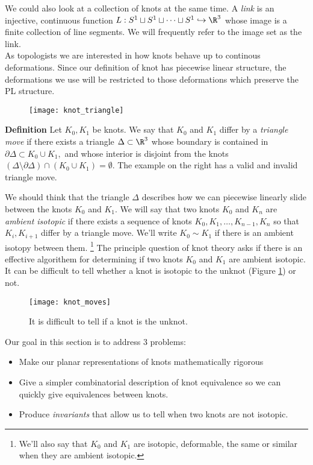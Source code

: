 We could also look at a collection of knots at the same time.  A \emph{link} is an injective, continuous function $L:S^1\sqcup S^1\sqcup \cdots \sqcup S^1 \hookrightarrow \R^3 $ whose image is a finite collection of line segments. We will frequently refer to the image set as the link. \\
As topologists we are interested in how knots behave up to continous deformations. Since our definition of knot has piecewise linear structure, the deformations we use will be restricted to those deformations which preserve the PL structure. \\


\noindent\begin{minipage}{\textwidth}

\setlength\intextsep{0pt}
\begin{wrapfigure}{r}{4cm}
\centering
\texttt{[image: knot\_triangle]}

\end{wrapfigure}
\textbf{Definition \thetheorem}
Let $K_0, K_1$ be knots. We say that $K_0$ and $K_1$ differ by a \emph{triangle move} if there exists a triangle $\Delta\subset \R^3$ whose boundary is contained in $\partial \Delta\subset K_0 \cup K_1,$
and whose interior is disjoint from the knots
$(\Delta\setminus \partial \Delta)\cap (K_0\cup K_1)=\emptyset.$
The example on the right has a valid and invalid triangle move.
\end{minipage}

We should think that the triangle $\Delta$ describes how we can piecewise linearly slide between the knots $K_0$ and $K_1$. We will say that two knots $K_0$ and $K_n$ are  \emph{ambient isotopic} if there exists a sequence of knots $K_0, K_1, \ldots,  K_{n-1}, K_n$ so that $K_i, K_{i+1}$ differ by a triangle move. We'll write $K_0\sim K_1$ if there is an ambient isotopy between them. \footnote{We'll also say that $K_0$ and $K_1$ are isotopic, deformable, the same or similar when they are ambient isotopic.} The principle question of knot theory asks if there is an effective algorithem for determining if two knots $K_0$ and $K_1$ are ambient isotopic. It can be difficult to tell whether a knot is isotopic to the unknot (Figure \ref{fig:knot_moves}) or not.
\begin{figure}
\centering
\texttt{[image: knot\_moves]}
\caption{It is difficult to tell if a knot is the unknot.}
\label{fig:knot_moves}
\end{figure}
Our goal in this section is to address 3 problems:
\begin{itemize}
\item Make our planar representations of knots mathematically rigorous
\item Give a simpler combinatorial description of knot equivalence so we can quickly give equivalences between knots. 
\item Produce \emph{invariants} that allow us to tell when two knots are not isotopic. 
\end{itemize}
